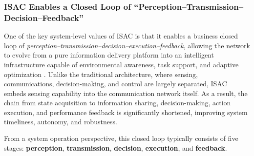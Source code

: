 \subsubsection{ISAC Enables a Closed Loop of ``Perception--Transmission--Decision--Feedback''}
\label{subsubsec:ch1-isac-core value-closed loop-isac}

One of the key system-level values of ISAC is that it enables a business closed loop of \emph{perception--transmission--decision--execution--feedback}, allowing the network to evolve from a pure information delivery platform into an intelligent infrastructure capable of environmental awareness, task support, and adaptive optimization \cite{Liu2022ISAC, Zhang2021ISAC6G, Saad2020Vision6G, ITU2030}.  
Unlike the traditional architecture, where sensing, communications, decision-making, and control are largely separated, ISAC embeds sensing capability into the communication network itself. As a result, the chain from state acquisition to information sharing, decision-making, action execution, and performance feedback is significantly shortened, improving system timeliness, autonomy, and robustness.

From a system operation perspective, this closed loop typically consists of five stages: \textbf{perception}, \textbf{transmission}, \textbf{decision}, \textbf{execution}, and \textbf{feedback}.

